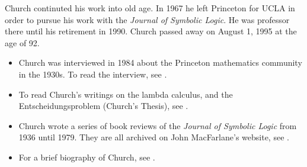 \documentclass[../../../include/open-logic-section]{subfiles}
\begin{document}
Church continuted his work into old age. In 1967 he left Princeton for UCLA
in order to pursue his work with the \emph{Journal of Symbolic Logic}. He
was professor there until his retirement in 1990. Church passed away on
August 1, 1995 at the age of 92.


\begin{reading} 
\begin{itemize} 
\item Church was interviewed in 1984 about
the Princeton mathematics community in the 1930s. To read the interview,
see \citet{Aspray1984}.

\item To read Church's writings on the lambda calculus, and the
Entscheidungsproblem (Church's Thesis), see \citet{Church1936,Church1936a}.

\item Church wrote a series of book reviews of the \emph{Journal of
Symbolic Logic} from 1936 until 1979. They are all archived on John
MacFarlane's website, see \citet{MacFarlane2015}.

\item For a brief biography of Church, see \citet{EndertonND}.

\end{itemize} 
\end{reading} 
\end{document}
